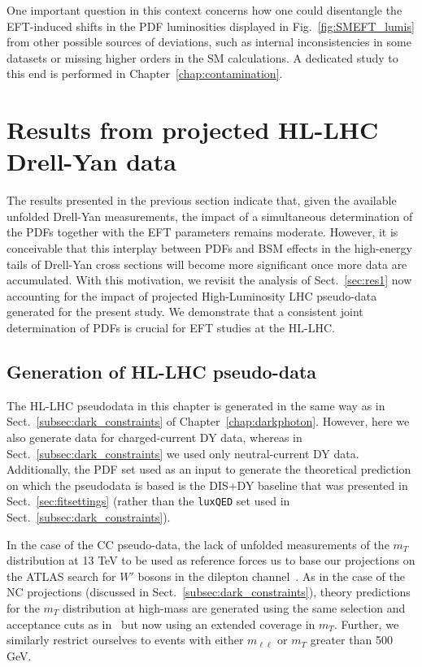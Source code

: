 \documentclass[withindex,glossary]{cam-thesis}
\begin{document}

One important question in this context concerns how one could disentangle the EFT-induced shifts in
the PDF luminosities displayed in Fig.~\ref{fig:SMEFT_lumis} from other possible sources
of deviations, such as internal inconsistencies in some datasets or missing higher
orders in the SM calculations. A dedicated study to this end is performed in Chapter~\ref{chap:contamination}.

\section{Results from projected HL-LHC Drell-Yan data}
\label{sec:hllhc}
The results presented in the previous section indicate that,
given the available unfolded Drell-Yan measurements,
the impact of a  simultaneous determination of the PDFs together with the EFT parameters
remains moderate.
%
However, it is conceivable that this
interplay between PDFs and BSM effects in the high-energy tails of
Drell-Yan cross sections will become more significant once more data are accumulated.
%
With this motivation, we revisit the analysis of Sect.~\ref{sec:res1}
now accounting for the impact of projected High-Luminosity LHC pseudo-data generated for the present study.
%
We demonstrate that a consistent joint determination of PDFs is crucial for
EFT studies at the HL-LHC.

\subsection{Generation of HL-LHC pseudo-data}
The HL-LHC pseudodata in this chapter is generated in the same way as in Sect.~\ref{subsec:dark_constraints}
of Chapter~\ref{chap:darkphoton}. However, here we also generate data for charged-current DY data,
whereas in Sect.~\ref{subsec:dark_constraints} we used only neutral-current DY data.
Additionally, the PDF set used as an input to
generate the theoretical prediction on which the pseudodata is based
 is the DIS+DY baseline that was presented
in Sect.~\ref{sec:fitsettings} (rather than the \texttt{luxQED} set used in Sect.~\ref{subsec:dark_constraints}).

In the case of the  CC pseudo-data, the lack of unfolded measurements
of the $m_T$ distribution at 13 TeV to be used as reference forces
us to base our projections on the
ATLAS search for $W'$ bosons in the dilepton channel~\cite{Aad:2019wvl}.
%
As in the case of the NC projections (discussed in Sect.~\ref{subsec:dark_constraints}), theory predictions for
the $m_T$ distribution at high-mass are generated
using the same selection and acceptance cuts as in~\cite{Aad:2019wvl}
but now using an extended coverage in $m_T$. Further, we similarly restrict ourselves
to events with either $m_{\ell\ell}$ or $m_T$ greater than 500 GeV.
\end{document}
